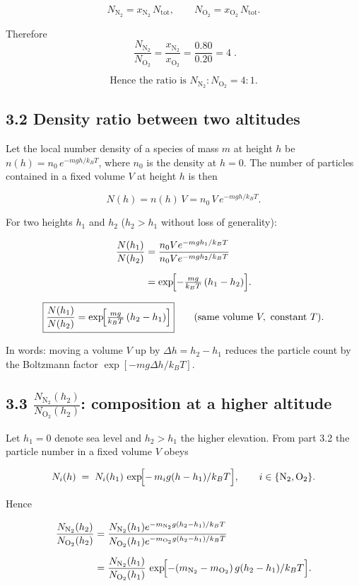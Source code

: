\documentclass[12pt]{article}
\theoremstyle{definition} %
\theoremstyle{plain} %
\begin{document}
\[
  N_{\mathrm{N_2}} = x_{\mathrm{N_2}}\,N_{\text{tot}},
  \qquad
  N_{\mathrm{O_2}} = x_{\mathrm{O_2}}\,N_{\text{tot}}.
\]

Therefore
\[
  \boxed{\;
    \frac{N_{\mathrm{N_2}}}{N_{\mathrm{O_2}}}
    = \frac{x_{\mathrm{N_2}}}{x_{\mathrm{O_2}}}
    = \frac{0.80}{0.20}
    = 4
  \;} .
\]

\[
  \text{Hence the ratio is }N_{\mathrm{N_2}}:N_{\mathrm{O_2}} = 4:1.
\]
\subsection*{3.2  Density ratio between two altitudes}

Let the local number density of a species of mass \(m\) at height \(h\) be
\(\displaystyle n(h)=n_0\,e^{-mgh/k_BT}\),
where \(n_0\) is the density at \(h=0\).  
The number of particles contained in a fixed volume \(V\) at height \(h\) is then  

\[
  N(h)=n(h)\,V
       =n_0\,V\,e^{-mgh/k_BT}.
\]

For two heights \(h_1\) and \(h_2\) (\(h_2>h_1\) without loss of generality):

\begin{align}
  \frac{N(h_1)}{N(h_2)}
  &=\frac{n_0 V e^{-mgh_1/k_BT}}{n_0 V e^{-mgh_2/k_BT}}
    \\[6pt]
  &=\exp\!\Bigl[-\tfrac{mg}{k_BT}\,(h_1-h_2)\Bigr].
\end{align}

\[
  \boxed{\displaystyle
    \frac{N(h_1)}{N(h_2)}
    =\exp\!\Bigl[\tfrac{mg}{k_BT}\,(h_2-h_1)\Bigr]}
  \qquad(\text{same volume }V,\ \text{constant }T).
\]

In words: moving a volume \(V\) up by \(\Delta h=h_2-h_1\) reduces the particle count by the Boltzmann factor \(\exp[-mg\Delta h/k_BT]\).
\subsection*{3.3  \(\displaystyle \frac{N_{\mathrm{N_2}}(h_2)}{N_{\mathrm{O_2}}(h_2)}\): composition at a higher altitude}

Let \(h_1=0\) denote sea level and \(h_2>h_1\) the higher elevation.  
From part 3.2 the particle number in a fixed volume \(V\) obeys  

\[
  N_i(h) \;=\; N_i(h_1)\,
               \exp\!\Bigl[-\,m_i g (h-h_1)/k_B T\Bigr],
  \qquad
  i\in\{\mathrm{N_2},\mathrm{O_2}\}.
\]

Hence

\[
  \begin{aligned}
      \frac{N_{\mathrm{N_2}}(h_2)}{N_{\mathrm{O_2}}(h_2)}
      &=\frac{N_{\mathrm{N_2}}(h_1)
             e^{-m_{\mathrm{N_2}}g(h_2-h_1)/k_B T}}
            {N_{\mathrm{O_2}}(h_1)
             e^{-m_{\mathrm{O_2}}g(h_2-h_1)/k_B T}} \\[6pt]
      &=\frac{N_{\mathrm{N_2}}(h_1)}{N_{\mathrm{O_2}}(h_1)}
        \,\exp\!\Bigl[-(m_{\mathrm{N_2}}-m_{\mathrm{O_2}})\,
                       g (h_2-h_1)/k_B T\Bigr].
  \end{aligned}
\]
\end{document}
